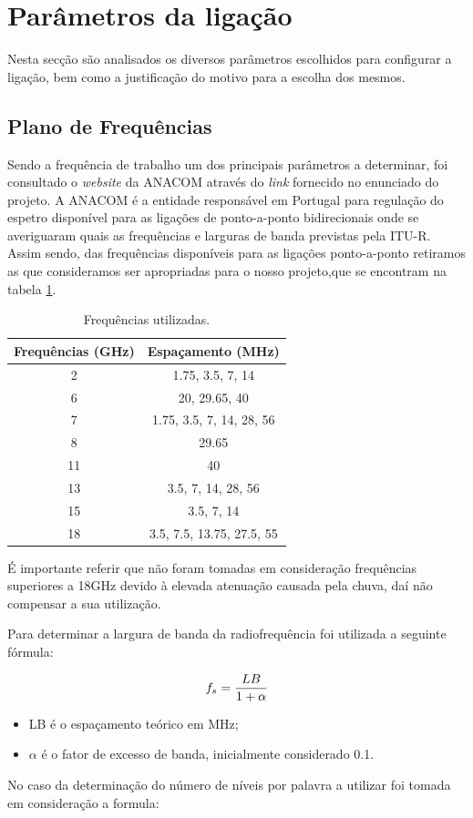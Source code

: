 \section{Parâmetros da ligação}
Nesta secção são analisados os diversos parâmetros escolhidos para configurar a ligação, bem como a justificação do motivo para a escolha dos mesmos.
\subsection{Plano de Frequências }
Sendo a frequência de trabalho um dos principais parâmetros a determinar, foi consultado o \textit{website} da ANACOM através do \textit{link} fornecido no enunciado do projeto. A ANACOM é a entidade responsável em Portugal para regulação do espetro disponível para as ligações de ponto-a-ponto bidirecionais onde se averiguaram quais as frequências e larguras de banda previstas pela ITU-R. Assim sendo, das frequências disponíveis para as ligações ponto-a-ponto retiramos as que consideramos ser apropriadas para o nosso projeto,que se encontram na tabela \ref{freqUsar}.

\begin{table}[H]
\centering
\begin{tabular}{|c|c|}
\hline
Frequências (GHz) & Espaçamento (MHz)\\
\hline
2 & 1.75, 3.5, 7, 14\\
6 & 20, 29.65, 40\\
7 & 1.75, 3.5, 7, 14, 28, 56\\
8 & 29.65\\
11 & 40\\
13 & 3.5, 7, 14, 28, 56\\
15 & 3.5, 7, 14\\
18 & 3.5, 7.5, 13.75, 27.5, 55\\
\hline
\end{tabular}
\caption{Frequências utilizadas.}
\label{freqUsar}
\end{table}

É importante referir que não foram tomadas em consideração frequências superiores a 18GHz devido à elevada atenuação causada pela chuva, daí não compensar a sua utilização.

Para determinar a largura de banda da radiofrequência foi utilizada a seguinte fórmula:

\begin{equation}
\centering
f_{s}=\frac{LB}{1+\alpha}
\end{equation}
\begin{itemize}
\item LB é o espaçamento teórico em MHz;
\item $\alpha$ é o fator de excesso de banda, inicialmente considerado 0.1.
\end{itemize} 
No caso da determinação do número de níveis por palavra a utilizar foi tomada em consideração a formula:

